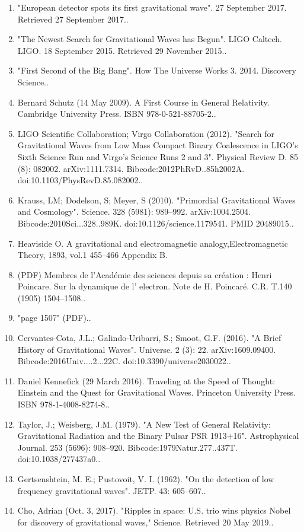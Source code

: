 \begin{enumerate}
\item "European detector spots its first gravitational wave". 27 September 2017. Retrieved 27 September 2017..
\item "The Newest Search for Gravitational Waves has Begun". LIGO Caltech. LIGO. 18 September 2015. Retrieved 29 November 2015..
\item "First Second of the Big Bang". How The Universe Works 3. 2014. Discovery Science..
\item Bernard Schutz (14 May 2009). A First Course in General Relativity. Cambridge University Press. ISBN 978-0-521-88705-2..
\item LIGO Scientific Collaboration; Virgo Collaboration (2012). "Search for Gravitational Waves from Low Mass Compact Binary Coalescence in LIGO's Sixth Science Run and Virgo's Science Runs 2 and 3". Physical Review D. 85 (8): 082002. arXiv:1111.7314. Bibcode:2012PhRvD..85h2002A. doi:10.1103/PhysRevD.85.082002..
\item Krauss, LM; Dodelson, S; Meyer, S (2010). "Primordial Gravitational Waves and Cosmology". Science. 328 (5981): 989–992. arXiv:1004.2504. Bibcode:2010Sci...328..989K. doi:10.1126/science.1179541. PMID 20489015..
\item Heaviside O. A gravitational and electromagnetic analogy,Electromagnetic Theory, 1893, vol.1 455–466 Appendix B.
\item (PDF) Membres de l'Académie des sciences depuis sa création : Henri Poincare. Sur la dynamique de l' electron. Note de H. Poincaré. C.R. T.140 (1905) 1504–1508..
\item "page 1507" (PDF)..
\item Cervantes-Cota, J.L.; Galindo-Uribarri, S.; Smoot, G.F. (2016). "A Brief History of Gravitational Waves". Universe. 2 (3): 22. arXiv:1609.09400. Bibcode:2016Univ....2...22C. doi:10.3390/universe2030022..
\item Daniel Kennefick (29 March 2016). Traveling at the Speed of Thought: Einstein and the Quest for Gravitational Waves. Princeton University Press. ISBN 978-1-4008-8274-8..
\item Taylor, J.; Weisberg, J.M. (1979). "A New Test of General Relativity: Gravitational Radiation and the Binary Pulsar PSR 1913+16". Astrophysical Journal. 253 (5696): 908–920. Bibcode:1979Natur.277..437T. doi:10.1038/277437a0..
\item Gertsenshtein, M. E.; Pustovoit, V. I. (1962). "On the detection of low frequency gravitational waves". JETP. 43: 605–607..
\item Cho, Adrian (Oct. 3, 2017). "Ripples in space: U.S. trio wins physics Nobel for discovery of gravitational waves," Science. Retrieved 20 May 2019..

\end{enumerate}
